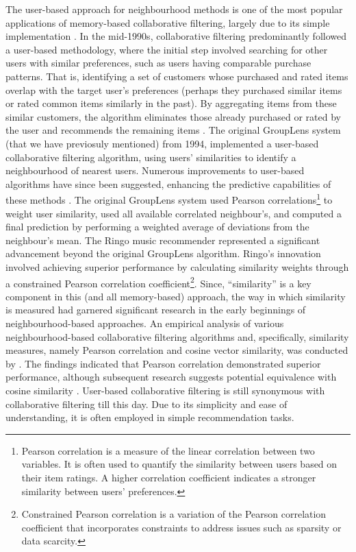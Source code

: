 The user-based approach for neighbourhood methods is one of the most popular applications of memory-based collaborative filtering, largely due to its simple implementation \cite{herlocker1999algorithmic}. In the mid-1990s, collaborative filtering predominantly followed a user-based methodology, where the initial step involved searching for other users with similar preferences, such as users having comparable purchase patterns. That is, identifying a set of customers whose purchased and rated items overlap with the target user's preferences (perhaps they purchased similar items or rated common items similarly in the past). By aggregating items from these similar customers, the algorithm eliminates those already purchased or rated by the user and recommends the remaining items \cite{smith2017two}. The original GroupLens system \cite{resnick1994grouplens} (that we have previosuly mentioned) from 1994, implemented a user-based collaborative filtering algorithm, using users' similarities to identify a neighbourhood of nearest users. Numerous improvements to user-based algorithms have since been suggested, enhancing the predictive capabilities of these methods \cite{breese2013empirical}. The original GroupLens system used Pearson correlations\footnote{Pearson correlation is a measure of the linear correlation between two variables. It is often used to quantify the similarity between users based on their item ratings. A higher correlation coefficient indicates a stronger similarity between users' preferences.} to weight user similarity, used all available correlated neighbour’s, and computed a final prediction by performing a weighted average of deviations from the neighbour’s mean. The Ringo music recommender \cite{shardanand1995social} represented a significant advancement beyond the original GroupLens algorithm. Ringo's innovation involved achieving superior performance by calculating similarity weights through a constrained Pearson correlation coefficient\footnote{Constrained Pearson correlation is a variation of the Pearson correlation coefficient that incorporates constraints to address issues such as sparsity or data scarcity.}. Since, “similarity” is a key component in this (and all memory-based) approach, the way in which similarity is measured had garnered significant research in the early beginnings of neighbourhood-based approaches. An empirical analysis of various neighbourhood-based collaborative filtering algorithms and, specifically, similarity measures, namely Pearson correlation and cosine vector similarity, was conducted by \cite{breese2013empirical}. The findings indicated that Pearson correlation demonstrated superior performance, although subsequent research suggests potential equivalence with cosine similarity \cite{pennock2013collaborative}. User-based collaborative filtering is still synonymous with collaborative filtering till this day. Due to its simplicity and ease of understanding, it is often employed in simple recommendation tasks. 


